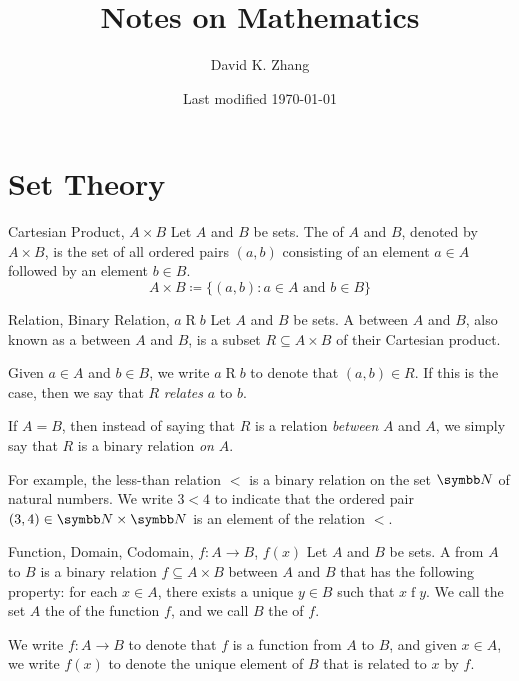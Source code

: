 \documentclass[12pt]{report}
\title{Notes on Mathematics}
\author{David K. Zhang}
\date{Last modified \today}
\begin{document}
\maketitle
{}
\listofdefinition
\clearpage
\listoftheorem
\clearpage
{}



\chapter{Set Theory}

\begin{dfnbox}{Cartesian Product, $A \times B$}
	Let $A$ and $B$ be sets. The  of $A$ and $B$, denoted by $A \times B$, is the set of all ordered pairs $(a, b)$ consisting of an element $a \in A$ followed by an element $b \in B$.
	\[ A \times B \coloneq \{ (a, b) : a \in A \text{ and } b \in B \} \]
\end{dfnbox}

\begin{dfnbox}{Relation, Binary Relation, $a \mathrel{R} b$}
	Let $A$ and $B$ be sets. A  between $A$ and $B$, also known as a  between $A$ and $B$, is a subset $R \subseteq A \times B$ of their Cartesian product.

	Given $a \in A$ and $b \in B$, we write $a \mathrel{R} b$ to denote that  $(a, b) \in R$. If this is the case, then we say that $R$ \textit{relates} $a$ to $b$.

	If $A = B$, then instead of saying that $R$ is a relation \textit{between} $A$ and $A$, we simply say that $R$ is a binary relation \textit{on} $A$.
\end{dfnbox}

For example, the less-than relation $<$ is a binary relation on the set $\N$ of natural numbers. We write $3 < 4$ to indicate that the ordered pair $(3, 4) \in \N \times \N$ is an element of the relation $<$.

\begin{dfnbox}{Function, Domain, Codomain, $f: A \to B$, $f(x)$}
	Let $A$ and $B$ be sets. A  from $A$ to $B$ is a binary relation $f \subseteq A \times B$ between $A$ and $B$ that has the following property: for each $x \in A$, there exists a unique $y \in B$ such that $x \mathrel{f} y$. We call the set $A$ the  of the function $f$, and we call $B$ the  of $f$.

	We write $f: A \to B$ to denote that $f$ is a function from $A$ to $B$, and given $x \in A$, we write $f(x)$ to denote the unique element of $B$ that is related to $x$ by $f$.
\end{dfnbox}
\end{document}
